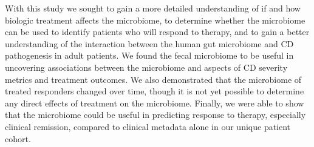 \documentclass[11pt,]{article}
\begin{document}
With this study we sought to gain a more detailed understanding of if
and how biologic treatment affects the microbiome, to determine whether
the microbiome can be used to identify patients who will respond to
therapy, and to gain a better understanding of the interaction between
the human gut microbiome and CD pathogenesis in adult patients. We found
the fecal microbiome to be useful in uncovering associations between the
microbiome and aspects of CD severity metrics and treatment outcomes. We
also demonstrated that the microbiome of treated responders changed over
time, though it is not yet possible to determine any direct effects of
treatment on the microbiome. Finally, we were able to show that the
microbiome could be useful in predicting response to therapy, especially
clinical remission, compared to clinical metadata alone in our unique
patient cohort.
\end{document}

